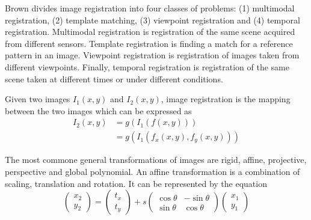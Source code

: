 \documentclass[11pt]{book}
\theoremstyle{example}
\begin{document}
Brown divides image registration into four classes of problems: (1) multimodal registration, (2) template matching, (3) viewpoint registration and (4) temporal registration. Multimodal registration is registration of the same scene acquired from different sensors. Template registration is finding a match for a reference pattern in an image. Viewpoint registration is registration of images taken from different viewpoints. Finally, temporal registration is registration of the same scene taken at different times or under different conditions.

Given two images $I_1(x,y)$ and $I_2(x,y)$, image registration is the mapping between the two images which can be expressed as
\begin{align}
	I_2(x,y)&=g(I_1(f(x,y)))\\
	&=g(I_1(f_x(x,y),f_y(x,y)))
\end{align}

The most commone general transformations of images are rigid, affine, projective, perspective and global polynomial. An affine transformation is a combination of scaling, translation and rotation. It can be represented by the equation
\begin{equation}
	\begin{pmatrix}
		x_2\\
		y_2
	\end{pmatrix}=
	\begin{pmatrix}
		t_x\\
		t_y
	\end{pmatrix}+
	s\begin{pmatrix}
		\cos{\theta}&-\sin{\theta}\\
		\sin{\theta}&\cos{\theta}
	\end{pmatrix}
	\begin{pmatrix}
		x_1\\
		y_1
	\end{pmatrix}
\end{equation}

\backmatter
\end{document}
